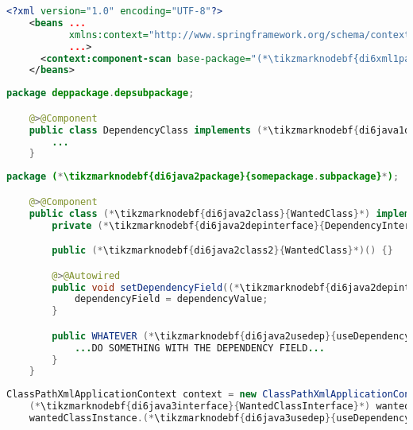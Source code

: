 \label{setterinjectionautowire}
\begin{lstlisting}[language=XML, title={Configuration XML}]
    <?xml version="1.0" encoding="UTF-8"?>
    <beans ...
           xmlns:context="http://www.springframework.org/schema/context"
           ...>
      <context:component-scan base-package="(*\tikzmarknodebf{di6xml1package}{somepackage.subpackage}[ForestGreen]*)"/>
    </beans>
\end{lstlisting}
\begin{lstlisting}[language=Java, title={Dependency class}]
    package deppackage.depsubpackage;

    @>@Component
    public class DependencyClass implements (*\tikzmarknodebf{di6java1depinterface}{DependencyInterface}*) {
        ...
    }
\end{lstlisting}
\begin{lstlisting}[language=Java, title={Wanted class with the zero--parameter constructor and the setter method}]
    package (*\tikzmarknodebf{di6java2package}{somepackage.subpackage}*);

    @>@Component
    public class (*\tikzmarknodebf{di6java2class}{WantedClass}*) implements (*\tikzmarknodebf{di6java2interface}{WantedClassInterface}*) {
        private (*\tikzmarknodebf{di6java2depinterface}{DependencyInterface}*) dependencyField;

        public (*\tikzmarknodebf{di6java2class2}{WantedClass}*)() {}

        @>@Autowired
        public void setDependencyField((*\tikzmarknodebf{di6java2depinterface2}{DependencyInterface}*) dependencyValue){
            dependencyField = dependencyValue;
        }

        public WHATEVER (*\tikzmarknodebf{di6java2usedep}{useDependency}*)() {
            ...DO SOMETHING WITH THE DEPENDENCY FIELD...
        }
    }
\end{lstlisting}
\begin{lstlisting}[language=Java, title={Usage}]
    ClassPathXmlApplicationContext context = new ClassPathXmlApplicationContext("configurationFile.xml");
    (*\tikzmarknodebf{di6java3interface}{WantedClassInterface}*) wantedClassInstance = context.getBean("(*\tikzmarknodebf{di6java3beanid}{wantedClass}[ForestGreen]*)", (*\tikzmarknodebf{di6java3interface2}{WantedClassInterface}*).class);
    wantedClassInstance.(*\tikzmarknodebf{di6java3usedep}{useDependency}*)();
\end{lstlisting}
\newpage

